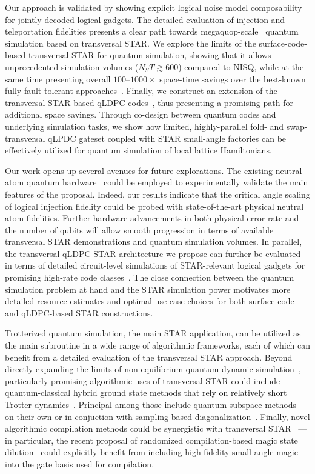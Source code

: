 \documentclass[aps, prx, reprint, superscriptaddress, longbibliography, floatfix]{revtex4-2}
\begin{document}
Our approach is validated by showing explicit logical noise model composability for jointly-decoded logical gadgets. The detailed evaluation of injection and teleportation fidelities presents a clear path towards megaquop-scale~\cite{Preskill2025} quantum simulation based on transversal STAR. We explore the limits of the surface-code-based transversal STAR for quantum simulation, showing that it allows unprecedented simulation volumes ($N_ST\gtrsim600$) compared to NISQ, while at the same time presenting overall $100\text{--}1000\times$ space-time savings over the best-known fully fault-tolerant approaches~\cite{Gidney2024}. Finally, we construct an extension of the transversal STAR-based qLDPC codes~\cite{Breuckmann2021}, thus presenting a promising path for additional space savings. Through co-design between quantum codes and underlying simulation tasks, we show how limited, highly-parallel fold- and swap-transversal qLPDC gateset coupled with STAR small-angle factories can be effectively utilized for quantum simulation of local lattice Hamiltonians.

Our work opens up several avenues for future explorations. The existing neutral atom quantum hardware~\cite{Bluvstein2024, Rodriguez2024} could be employed to experimentally validate the main features of the proposal.  Indeed, our results indicate that the critical angle scaling of logical injection fidelity could be probed with state-of-the-art physical neutral atom fidelities. Further hardware advancements in both physical error rate and the number of qubits will allow smooth progression in terms of available transversal STAR demonstrations and quantum simulation volumes. In parallel, the transversal qLDPC-STAR architecture we propose can further be evaluated in terms of detailed circuit-level simulations of STAR-relevant logical gadgets for promising high-rate code classes~\cite{Yoder2025, Ataides2025, Yang2025}. The close connection between the quantum simulation problem at hand and the STAR simulation power motivates more detailed resource estimates and optimal use case choices for both surface code~\cite{Akahoshi2024b} and qLDPC-based STAR constructions. 

Trotterized quantum simulation, the main STAR application, can be utilized as the main subroutine in a wide range of algorithmic frameworks, each of which can benefit from a detailed evaluation of the transversal STAR approach. Beyond directly expanding the limits of non-equilibrium quantum dynamic simulation~\cite{Haghshenas2025}, particularly promising algorithmic uses of transversal STAR could include quantum-classical hybrid ground state methods that rely on relatively short Trotter dynamics~\cite{Ding_2023, Mi_2024}. Principal among those include quantum subspace methods~\cite{Epperly2022, Shen2023, Yoshioka2024} on their own or in conjuction with sampling-based diagonalization~\cite{Klymko2021, Yu2025, Moreno2025}. Finally, novel algorithmic compilation methods could be synergistic with transversal STAR~\cite{Campbell2019, gunther2025phaseestimationpartiallyrandomized} --- in particular, the recent proposal of randomized compilation-based magic state dilution~\cite{Luthra2025} could explicitly benefit from including high fidelity small-angle magic into the gate basis used for compilation. 
\end{document}
